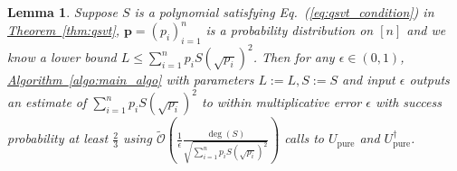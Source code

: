 \documentclass[journal]{IEEEtran}
\newtheorem{lemma}{Lemma}
\newcommand{\eq}[1]{Eq.~(\ref{eq:#1})}
\newcommand{\thm}[1]{\hyperref[thm:#1]{Theorem~\ref*{thm:#1}}}
\newcommand{\lem}[1]{\hyperref[lem:#1]{Lemma~\ref*{lem:#1}}}
\newcommand{\algo}[1]{\hyperref[algo:#1]{Algorithm~\ref*{algo:#1}}}
\newcommand{\xzw}[1]{{\color{blue}{Xinzhao: \textbf{#1}}}}
\begin{document}
\begin{lemma}
\label{lem:main_algo}
  Suppose $S$ is a polynomial satisfying \eq{qsvt_condition} in \thm{qsvt}, $\mathbf{p} = (p_i)_{i=1}^n$ is a probability distribution on $[n]$ and we know a lower bound $L \le \sum_{i=1}^n p_i S(\sqrt{p_i})^2$. Then for any $\epsilon\in(0,1)$, \algo{main_algo} with parameters $L:=L,S:=S$ and input $\epsilon$ outputs an estimate of $\sum_{i=1}^n p_i S(\sqrt{p_i})^2$ to within multiplicative error $\epsilon$ with success probability at least $\frac{2}{3}$ using $\widetilde{\mathcal{O}}\left(\frac{1}{\epsilon}\frac{\deg(S)}{\sqrt{\sum_{i=1}^n p_i S(\sqrt{p_i})^2}}\right)$ calls to $U_{\mathrm{pure}}$ and $U_{\mathrm{pure}}^\dagger$.
\end{lemma}
\end{document}
